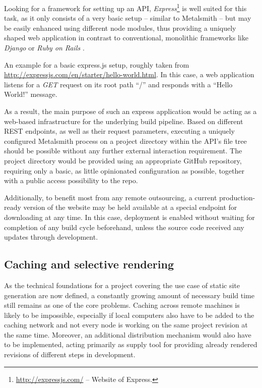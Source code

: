 Looking for a framework for setting up an API, \emph{Express}\footnote{\url{http://expressjs.com/} -- Website of Express.} is well suited for this task, as it only consists of a very basic setup -- similar to Metalsmith -- but may be easily enhanced using different node modules, thus providing a uniquely shaped web application in contrast to conventional, monolithic frameworks like \emph{Django} or \emph{Ruby on Rails} \cite[176]{cantelon2017node}.

\begin{program}
  \caption{An example for a basic express.js setup, roughly taken from \url{http://expressjs.com/en/starter/hello-world.html}. In this case, a web application listens for a \emph{GET} request on its root path ``/'' and responds with a ``Hello World!'' message.}
  \label{list:express-setup}

\end{program}

As a result, the main purpose of such an express application would be acting as a web-based infrastructure for the underlying build pipeline. Based on different REST endpoints, as well as their request parameters, executing a uniquely configured Metalsmith process on a project directory within the API's file tree should be possible without any further external interaction requirement. The project directory would be provided using an appropriate GitHub repository, requiring only a basic, as little opinionated configuration as possible, together with a public access possibility to the repo.

Additionally, to benefit most from any remote outsourcing, a current production-ready version of the website may be held available at a special endpoint for downloading at any time. In this case, deployment is enabled without waiting for completion of any build cycle beforehand, unless the source code received any updates through development.


\subsection{Caching and selective rendering}
\label{sec:primarythoughts-rendering}

As the technical foundations for a project covering the use case of static site generation are now defined, a constantly growing amount of necessary build time still remains as one of the core problems. Caching across remote machines is likely to be impossible, especially if local computers also have to be added to the caching network and not every node is working on the same project revision at the same time. Moreover, an additional distribution mechanism would also have to be implemented, acting primarily as supply tool for providing already rendered revisions of different steps in development.

